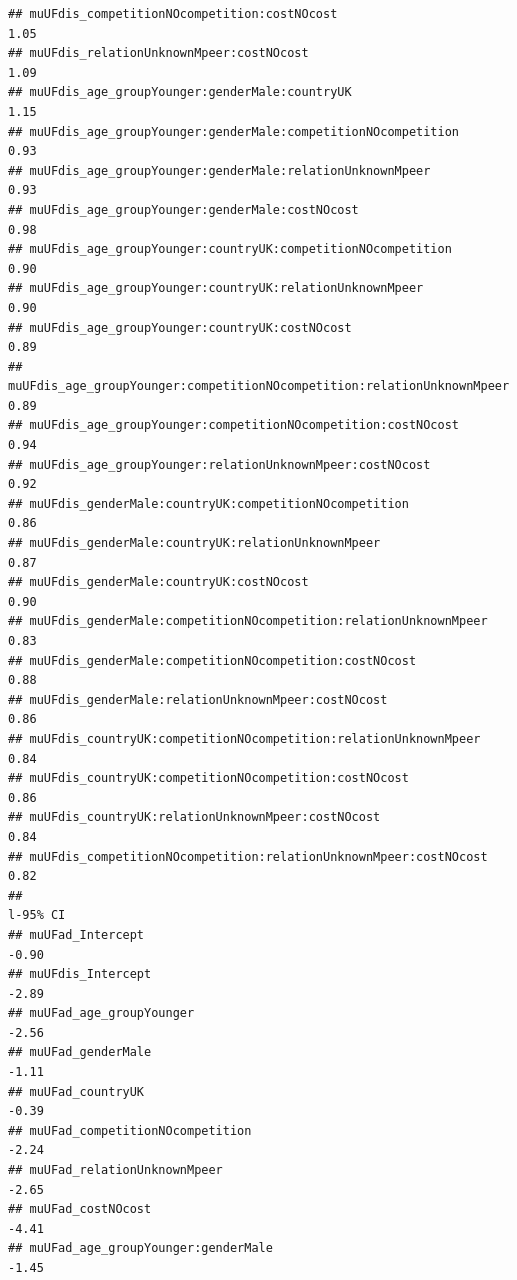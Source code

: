 \documentclass[
]{article}
\begin{document}
\begin{verbatim}
## muUFdis_competitionNOcompetition:costNOcost                                 1.05
## muUFdis_relationUnknownMpeer:costNOcost                                     1.09
## muUFdis_age_groupYounger:genderMale:countryUK                               1.15
## muUFdis_age_groupYounger:genderMale:competitionNOcompetition                0.93
## muUFdis_age_groupYounger:genderMale:relationUnknownMpeer                    0.93
## muUFdis_age_groupYounger:genderMale:costNOcost                              0.98
## muUFdis_age_groupYounger:countryUK:competitionNOcompetition                 0.90
## muUFdis_age_groupYounger:countryUK:relationUnknownMpeer                     0.90
## muUFdis_age_groupYounger:countryUK:costNOcost                               0.89
## muUFdis_age_groupYounger:competitionNOcompetition:relationUnknownMpeer      0.89
## muUFdis_age_groupYounger:competitionNOcompetition:costNOcost                0.94
## muUFdis_age_groupYounger:relationUnknownMpeer:costNOcost                    0.92
## muUFdis_genderMale:countryUK:competitionNOcompetition                       0.86
## muUFdis_genderMale:countryUK:relationUnknownMpeer                           0.87
## muUFdis_genderMale:countryUK:costNOcost                                     0.90
## muUFdis_genderMale:competitionNOcompetition:relationUnknownMpeer            0.83
## muUFdis_genderMale:competitionNOcompetition:costNOcost                      0.88
## muUFdis_genderMale:relationUnknownMpeer:costNOcost                          0.86
## muUFdis_countryUK:competitionNOcompetition:relationUnknownMpeer             0.84
## muUFdis_countryUK:competitionNOcompetition:costNOcost                       0.86
## muUFdis_countryUK:relationUnknownMpeer:costNOcost                           0.84
## muUFdis_competitionNOcompetition:relationUnknownMpeer:costNOcost            0.82
##                                                                        l-95% CI
## muUFad_Intercept                                                          -0.90
## muUFdis_Intercept                                                         -2.89
## muUFad_age_groupYounger                                                   -2.56
## muUFad_genderMale                                                         -1.11
## muUFad_countryUK                                                          -0.39
## muUFad_competitionNOcompetition                                           -2.24
## muUFad_relationUnknownMpeer                                               -2.65
## muUFad_costNOcost                                                         -4.41
## muUFad_age_groupYounger:genderMale                                        -1.45

\end{verbatim}
\end{document}
